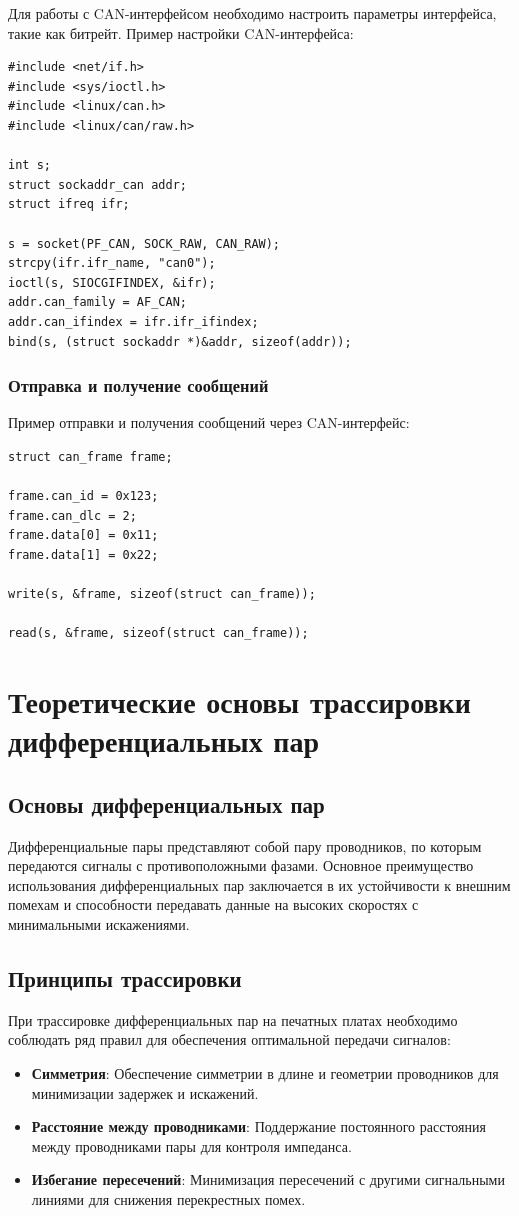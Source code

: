 \documentclass[16pt]{article}
\begin{document}
Для работы с CAN-интерфейсом необходимо настроить параметры интерфейса, такие как битрейт. Пример настройки CAN-интерфейса:

\begin{verbatim}
#include <net/if.h>
#include <sys/ioctl.h>
#include <linux/can.h>
#include <linux/can/raw.h>

int s;
struct sockaddr_can addr;
struct ifreq ifr;

s = socket(PF_CAN, SOCK_RAW, CAN_RAW);
strcpy(ifr.ifr_name, "can0");
ioctl(s, SIOCGIFINDEX, &ifr);
addr.can_family = AF_CAN;
addr.can_ifindex = ifr.ifr_ifindex;
bind(s, (struct sockaddr *)&addr, sizeof(addr));
\end{verbatim}

\subsubsection{Отправка и получение сообщений}

Пример отправки и получения сообщений через CAN-интерфейс:

\begin{verbatim}
struct can_frame frame;

frame.can_id = 0x123;
frame.can_dlc = 2;
frame.data[0] = 0x11;
frame.data[1] = 0x22;

write(s, &frame, sizeof(struct can_frame));

read(s, &frame, sizeof(struct can_frame));
\end{verbatim}


\section{Теоретические основы трассировки дифференциальных пар}

\subsection{Основы дифференциальных пар}
Дифференциальные пары представляют собой пару проводников, по которым передаются сигналы с противоположными фазами. Основное преимущество использования дифференциальных пар заключается в их устойчивости к внешним помехам и способности передавать данные на высоких скоростях с минимальными искажениями.

\subsection{Принципы трассировки}
При трассировке дифференциальных пар на печатных платах необходимо соблюдать ряд правил для обеспечения оптимальной передачи сигналов:
\begin{itemize}
    \item \textbf{Симметрия}: Обеспечение симметрии в длине и геометрии проводников для минимизации задержек и искажений.
    \item \textbf{Расстояние между проводниками}: Поддержание постоянного расстояния между проводниками пары для контроля импеданса.
    \item \textbf{Избегание пересечений}: Минимизация пересечений с другими сигнальными линиями для снижения перекрестных помех.
\end{itemize}
\end{document}
